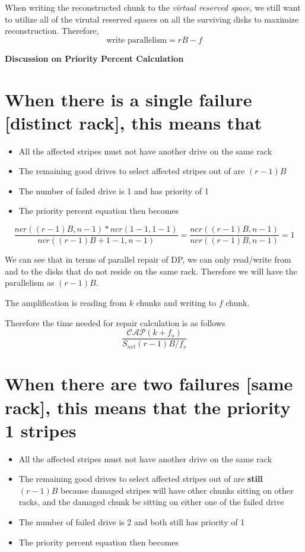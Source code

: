 \documentclass[journal]{IEEEtran}
\begin{document}
When writing the reconstructed chunk to the \textit{virtual reserved space}, we still want to utilize all of the virutal reserved spaces on all the surviving disks to maximize reconstruction. Therefore,
\begin{equation*}
  \text{write parallelism}=rB-f
\end{equation*}

\hspace*{1cm}

\textbf{Discussion on Priority Percent Calculation}

\section{When there is a single failure [distinct rack], this means that}
\begin{itemize}
  \item All the affected stripes must not have another drive on the same rack
  \item The remaining good drives to select affected stripes out of are $(r-1)B$
  \item The number of failed drive is 1 and has priority of 1
  \item The priority percent equation then becomes
\end{itemize}

\begin{equation*}
  \frac{ncr((r-1)B, n-1)*ncr(1-1, 1-1)}{ncr((r-1)B+1-1, n-1)}=\frac{ncr((r-1)B, n-1)}{ncr((r-1)B, n-1)}=1
\end{equation*}

We can see that in terms of parallel repair of DP, we can only read/write from and to the disks that do not reside on the same rack. Therefore we will have the parallelism as $(r-1)B$. 

The amplification is reading from $k$ chunks and writing to $f$ chunk.

Therefore the time needed for repair calculation is as follows
\begin{equation*}
  \frac{\mathcal{CAP}(k+f_s)}{S_{net}(r-1)B/f_s}
\end{equation*}

\section{When there are two failures [same rack], this means that the \textbf{priority 1 stripes} }
\begin{itemize}
  \item All the affected stripes must not have another drive on the same rack
  \item The remaining good drives to select affected stripes out of are \textbf{still} $(r-1)B$ because damaged stripes will have other chunks sitting on other racks, and the damaged chunk be sitting on either one of the failed drive
  \item The number of failed drive is 2 and both still has priority of 1
  \item The priority percent equation then becomes
\end{itemize}
\end{document}
